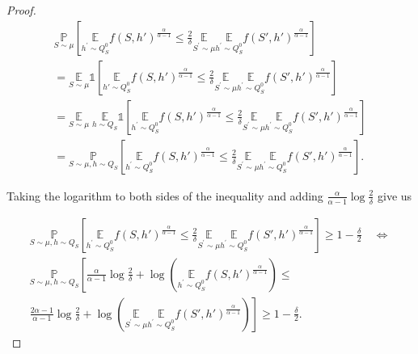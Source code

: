 \begin{noaddcontents}
\begin{proof}[Proof]
\begin{multline*}
\underset{S \sim \mu}{\mathbb{P}}\left[\underset{h^{\prime} \sim Q_S^0}{\mathbb{E}} f(S,h')^{\frac{\alpha}{\alpha-1}} \leq \frac{2}{\delta} \underset{S^{\prime} \sim \mu}{\mathbb{E}} \underset{h^{\prime} \sim Q_S^0}{\mathbb{E}} f(S',h')^{\frac{\alpha}{\alpha-1}}\right] \\
=\underset{S \sim \mu}{\mathbb{E}}\mathds{1}\left[\underset{h'\sim Q_S^0}{\mathbb{E}} f(S,h')^{\frac{\alpha}{\alpha-1}} \leq \frac{2}{\delta} \underset{S^{\prime} \sim \mu}{\mathbb{E}} \underset{h^{\prime} \sim Q_S^0}{\mathbb{E}} f(S',h')^{\frac{\alpha}{\alpha-1}}\right] \\
=\underset{S \sim \mu}{\mathbb{E}}\; \underset{h \sim Q_{S}}{\mathbb{E}} \mathds{1}\left[\underset{h^{\prime} \sim Q_S^0}{\mathbb{E}} f(S,h')^{\frac{\alpha}{\alpha-1}} \leq \frac{2}{\delta} \underset{S^{\prime} \sim \mu}{\mathbb{E}} \underset{h^{\prime} \sim Q_S^0}{\mathbb{E}} f(S',h')^{\frac{\alpha}{\alpha-1}}\right] \\
=\underset{S \sim \mu, h \sim Q_{S}}{\mathbb{P}}\left[\underset{h^{\prime} \sim Q_S^0}{\mathbb{E}} f(S,h')^{\frac{\alpha}{\alpha-1}} \leq \frac{2}{\delta} \underset{S^{\prime} \sim \mu}{\mathbb{E}} \underset{h^{\prime} \sim Q_S^0}{\mathbb{E}} f(S',h')^{\frac{\alpha}{\alpha-1}}\right] .
\end{multline*}

Taking the logarithm to both sides of the inequality and adding $\frac{\alpha}{\alpha-1} \log \frac{2}{\delta}$ give us

\begin{multline}
\underset{S \sim \mu, h \sim Q_{S}}{\mathbb{P}}\left[\underset{h^{\prime} \sim Q_S^0}{\mathbb{E}} f(S,h')^{\frac{\alpha}{\alpha-1}} \leq \frac{2}{\delta} \underset{S^{\prime} \sim \mu}{\mathbb{E}} \underset{h^{\prime} \sim Q_S^0}{\mathbb{E}} f(S',h')^{\frac{\alpha}{\alpha-1}}\right] \geq 1-\frac{\delta}{2} \quad \Longleftrightarrow \\
\label{eq: viallard_dis_eq12}
\underset{S \sim \mu, h \sim Q_{S}}{\mathbb{P}}\left[\frac{\alpha}{\alpha-1} \log \frac{2}{\delta}+\log \left(\underset{h^{\prime} \sim Q_S^0}{\mathbb{E}} f(S,h')^{\frac{\alpha}{\alpha-1}}\right) \leq \right. \\
 \left. \frac{2 \alpha-1}{\alpha-1} \log \frac{2}{\delta}+\log \left(\underset{S^{\prime} \sim \mu}{\mathbb{E}} \underset{h^{\prime} \sim Q_S^0}{\mathbb{E}} f(S',h')^{\frac{\alpha}{\alpha-1}}\right)\right] \geq 1-\frac{\delta}{2} .
\end{multline}


\end{proof}
\end{noaddcontents}
